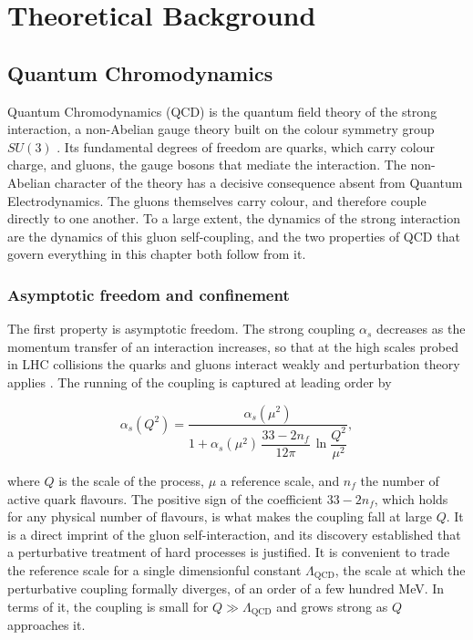 \chapter{Theoretical Background}
\label{cap:estado-da-arte}

\section{Quantum Chromodynamics}
\label{sec:qcd}

Quantum Chromodynamics (QCD) is the quantum field theory of the strong interaction,
a non-Abelian gauge theory built on the colour symmetry group $SU(3)$ \cite{Ellis:1996mzs}.
Its fundamental degrees of freedom are quarks, which carry colour charge, and gluons,
the gauge bosons that mediate the interaction. The non-Abelian character of the theory
has a decisive consequence absent from Quantum Electrodynamics. The gluons themselves
carry colour, and therefore couple directly to one another. To a large extent, the
dynamics of the strong interaction are the dynamics of this gluon self-coupling, and
the two properties of QCD that govern everything in this chapter both follow from it.

\subsection{Asymptotic freedom and confinement}

The first property is asymptotic freedom. The strong coupling $\alpha_s$ decreases
as the momentum transfer of an interaction increases, so that at the high scales 
probed in LHC collisions the quarks and gluons interact weakly and perturbation
theory applies \cite{Gross:1973id,Politzer:1973fx}. The running of the coupling
is captured at leading order by

\begin{equation}
    \alpha_s(Q^2) = \frac{\alpha_s(\mu^2)}
    {1 + \alpha_s(\mu^2)\,\dfrac{33 - 2 n_f}{12\pi}\,\ln\!\dfrac{Q^2}{\mu^2}},
    \label{eq:running}
\end{equation}

where $Q$ is the scale of the process, $\mu$ a reference scale, and $n_f$ the
number of active quark flavours. The positive sign of the coefficient
$33 - 2n_f$, which holds for any physical number of flavours, is what makes the
coupling fall at large $Q$.  It is a direct imprint of the gluon self-interaction,
and its discovery established that a perturbative treatment of hard processes is
justified. It is convenient to trade the reference scale for a single dimensionful
constant $\Lambda_{\mathrm{QCD}}$, the scale at which the perturbative coupling formally
diverges, of an order of a few hundred MeV. In terms of it, the coupling is small for
$Q \gg \Lambda_{\mathrm{QCD}}$ and grows strong as $Q$ approaches it.

